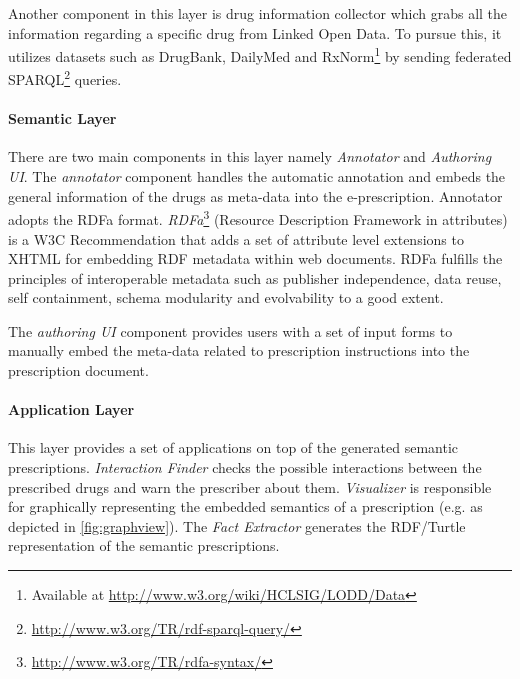 \documentclass[10pt, conference, compsocconf]{IEEEtran}
\begin{document}
Another component in this layer is drug information collector which grabs all the information regarding a specific drug from Linked Open Data.
To pursue this, it utilizes datasets such as DrugBank, DailyMed and RxNorm\footnote{Available at \url{http://www.w3.org/wiki/HCLSIG/LODD/Data}} by sending federated SPARQL\footnote{\url{http://www.w3.org/TR/rdf-sparql-query/}} queries.

\paragraph{Semantic Layer}
There are two main components in this layer namely \emph{Annotator} and \emph{Authoring UI}.
The \emph{annotator} component handles the automatic annotation and embeds the general information of the drugs as meta-data into the e-prescription.
Annotator adopts the RDFa format. \emph{RDFa}\footnote{\url{http://www.w3.org/TR/rdfa-syntax/}} (Resource Description Framework in attributes) is a W3C Recommendation that adds a set of attribute level extensions to XHTML for embedding RDF metadata within web documents.
RDFa fulfills the principles of interoperable metadata such as publisher independence, data reuse, self containment, schema modularity and evolvability to a good extent.

The \emph{authoring UI} component provides users with a set of input forms to manually embed the meta-data related to prescription instructions into the prescription document.

\paragraph{Application Layer}
This layer provides a set of applications on top of the generated semantic prescriptions.
\emph{Interaction Finder} checks the possible interactions between the prescribed drugs and warn the prescriber about them.
\emph{Visualizer} is responsible for graphically representing the embedded semantics of a prescription (e.g. as depicted in \autoref{fig:graphview}).
The \emph{Fact Extractor} generates the RDF/Turtle representation of the semantic prescriptions.
\end{document}
